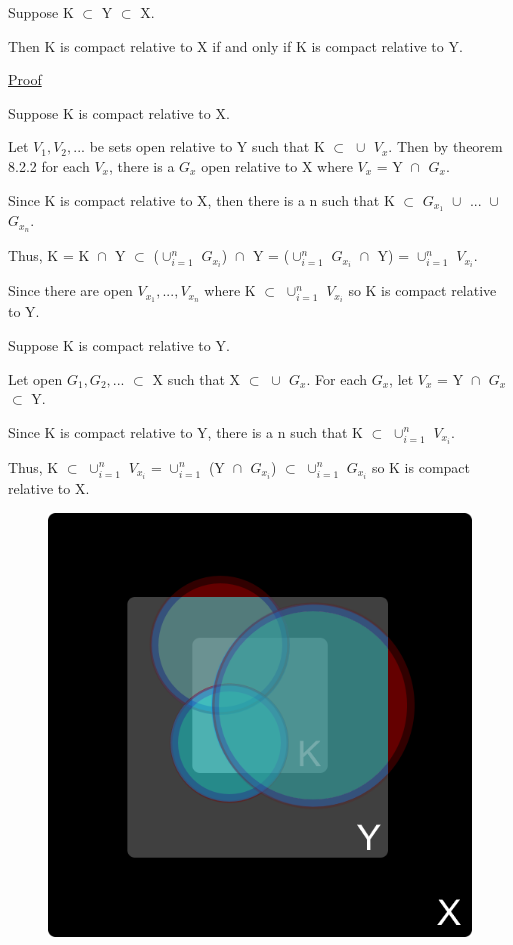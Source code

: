 	\begin{adjustbox}{minipage=14cm, right, vspace=0.1cm 0cm}
		Suppose K $\subset$ Y $\subset$ X.

		Then K is compact relative to X if and only if K is
		compact relative to Y.
	\end{adjustbox}

{ \color{magenta} \underline{Proof} } 

	Suppose K is compact relative to X.

	Let $V_1, V_2, ...$ be sets open relative to Y such that
	K $\subset$ $\cup_{}^{}$ $V_x$.
	Then by {\color{red} theorem 8.2.2} for each $V_x$, there is a
	$G_x$ open relative to X where $V_x$ = Y $\cap_{}^{}$ $G_x$.

	Since K is compact relative to X, then there is a n such that
	K $\subset$ $G_{x_1}$ $\cup_{}^{}$ ... $\cup_{}^{}$ $G_{x_n}$.

	Thus, K = K $\cap_{}^{}$ Y $\subset$ ($\cup_{i=1}^{n}$ $G_{x_i}$) $\cap_{}^{}$ Y
	= ($\cup_{i=1}^{n}$ $G_{x_i}$ $\cap_{}^{}$ Y) = $\cup_{i=1}^{n}$ $V_{x_i}$.
	
	Since there are open $V_{x_1}, ... , V_{x_n}$ where
	K $\subset$ $\cup_{i=1}^{n}$ $V_{x_i}$ so K is compact relative to Y.

	Suppose K is compact relative to Y.

	Let open $G_1, G_2, ...$ $\subset$ X such that X $\subset$ $\cup_{}^{}$ $G_x$.
	For each $G_x$, let $V_x$ = Y $\cap_{}^{}$ $G_x$ $\subset$ Y.

	Since K is compact relative to Y, there is a n such that
	K $\subset$ $\cup_{i=1}^{n}$ $V_{x_i}$.

	Thus, K $\subset$ $\cup_{i=1}^{n}$ $V_{x_i}$
	= $\cup_{i=1}^{n}$ (Y $\cap_{}^{}$ $G_{x_i}$)
	$\subset$ $\cup_{i=1}^{n}$ $G_{x_i}$ so K is compact relative to X.

\begin{figure}[h]
	\centering
	\includegraphics[scale=0.35]{Images/8.3.3.png}
\end{figure}

